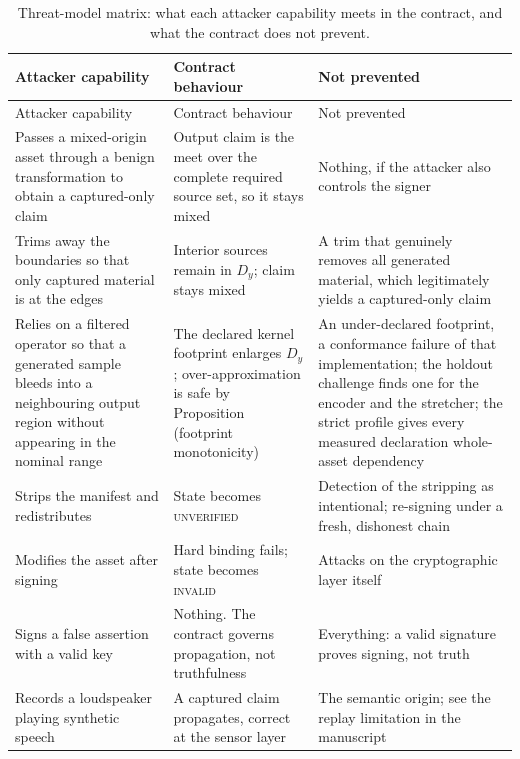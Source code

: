 \documentclass[11pt]{article}
\begin{document}
\begin{longtable}{p{}%
                  p{}%
                  p{}}
\caption{Threat-model matrix: what each attacker capability meets in the
contract, and what the contract does not prevent.}\label{tab:threat}\\
\toprule
Attacker capability & Contract behaviour & Not prevented \\
\midrule
\endfirsthead
\toprule
Attacker capability & Contract behaviour & Not prevented \\
\midrule
\endhead
Passes a mixed-origin asset through a benign transformation to obtain a
captured-only claim &
Output claim is the meet over the complete required source set, so it stays
mixed &
Nothing, if the attacker also controls the signer \\
\addlinespace
Trims away the boundaries so that only captured material is at the edges &
Interior sources remain in $D_y$; claim stays mixed &
A trim that genuinely removes all generated material, which legitimately yields
a captured-only claim \\
\addlinespace
Relies on a filtered operator so that a generated sample bleeds into a
neighbouring output region without appearing in the nominal range &
The declared kernel footprint enlarges $D_y$; over-approximation is safe by
Proposition~\PropFootprint{} (footprint monotonicity) &
An under-declared footprint, a conformance failure of that implementation;
the holdout challenge finds one for the encoder and the stretcher; the strict
profile gives every measured declaration whole-asset dependency \\
\addlinespace
Strips the manifest and redistributes &
State becomes \textsc{unverified} &
Detection of the stripping as intentional; re-signing under a fresh, dishonest
chain \\
\addlinespace
Modifies the asset after signing &
Hard binding fails; state becomes \textsc{invalid} &
Attacks on the cryptographic layer itself \\
\addlinespace
Signs a false assertion with a valid key &
Nothing. The contract governs propagation, not truthfulness &
Everything: a valid signature proves signing, not truth \\
\addlinespace
Records a loudspeaker playing synthetic speech &
A captured claim propagates, correct at the sensor layer &
The semantic origin; see the replay limitation in the manuscript \\
\bottomrule
\end{longtable}
\end{document}
